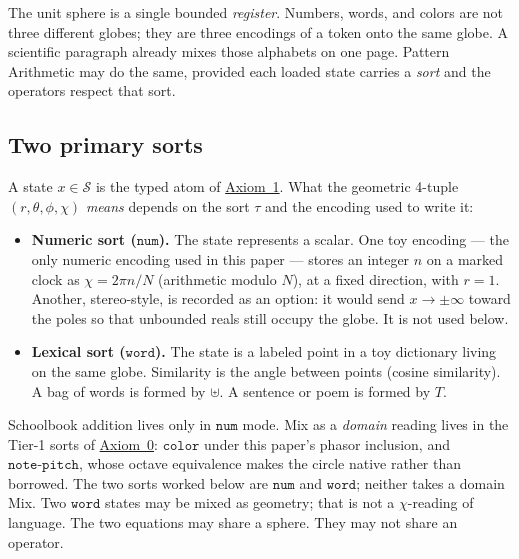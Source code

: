 \documentclass[12pt, a4paper]{article}
\begin{document}
The unit sphere is a single bounded \emph{register}.
Numbers, words, and colors are not three different globes; they are
three encodings of a token onto the same globe. A scientific paragraph
already mixes those alphabets on one page. Pattern Arithmetic may do
the same, provided each loaded state carries a \emph{sort} and the
operators respect that sort.

\subsection{Two primary sorts}
\label{subsec:sorts}
A state $x\in\mathcal{S}$ is the typed atom of
\hyperref[subsec:axiom1]{Axiom~1}. What the geometric 4-tuple
$(r,\theta,\phi,\chi)$ \emph{means} depends on the sort $\tau$ and the
encoding used to write it:
\begin{itemize}
    \item \textbf{Numeric sort ($\mathtt{num}$).}
          The state represents a scalar. One toy encoding --- the only
          numeric encoding used in this paper --- stores an
          integer $n$ on a marked clock as
          $\chi = 2\pi n/N$ (arithmetic modulo $N$), at a fixed
          direction, with $r=1$.
          Another, stereo-style, is recorded as an option: it would
          send $x\to\pm\infty$ toward the
          poles so that unbounded reals still occupy the globe. It is
          not used below.
    \item \textbf{Lexical sort ($\mathtt{word}$).}
          The state is a labeled point in a toy dictionary living on
          the same globe. Similarity is the angle between points
          (cosine similarity). A bag of words is formed by $\uplus$.
          A sentence or poem is formed by $T$.
\end{itemize}
Schoolbook addition lives only in $\mathtt{num}$ mode.
Mix as a \emph{domain} reading lives in the Tier-1 sorts of
\hyperref[subsec:axiom0_admissibility]{Axiom~0}: $\mathtt{color}$ under this
paper's phasor inclusion, and $\mathtt{note\text{-}pitch}$, whose
octave equivalence makes the circle native rather than borrowed.
The two sorts worked below are $\mathtt{num}$ and $\mathtt{word}$;
neither takes a domain Mix.
Two $\mathtt{word}$ states may be mixed as geometry; that is not a
$\chi$-reading of language. The two equations may share a sphere.
They may not share an operator.
\end{document}
